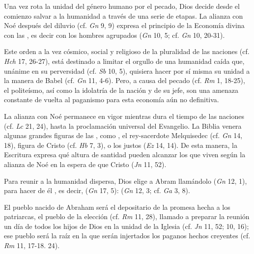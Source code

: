 \begin{ccebody}

 Una vez rota la unidad del género humano por el pecado, Dios decide desde el comienzo salvar a la humanidad a través de una serie de etapas. La alianza con Noé después del diluvio (cf. \textit{Gn} 9, 9) expresa el principio de la Economía divina con las , es decir con los hombres agrupados  (\textit{Gn} 10, 5; cf. \textit{Gn} 10, 20-31).

 Este orden a la vez cósmico, social y religioso de la pluralidad de las naciones (cf. \textit{Hch} 17, 26-27), está destinado a limitar el orgullo de una humanidad caída que, unánime en su perversidad (cf. \textit{Sb} 10, 5), quisiera hacer por sí misma su unidad a la manera de Babel (cf. \textit{Gn} 11, 4-6). Pero, a causa del pecado (cf. \textit{Rm} 1, 18-25), el politeísmo, así como la idolatría de la nación y de su jefe, son una amenaza constante de vuelta al paganismo para esta economía aún no definitiva.

 La alianza con Noé permanece en vigor mientras dura el tiempo de las naciones (cf. \textit{Lc} 21, 24), hasta la proclamación universal del Evangelio. La Biblia venera algunas grandes figuras de las , como , el rey-sacerdote Melquisedec (cf. \textit{Gn} 14, 18), figura de Cristo (cf. \textit{Hb} 7, 3), o los justos  (\textit{Ez} 14, 14). De esta manera, la Escritura expresa qué altura de santidad pueden alcanzar los que viven según la alianza de Noé en la espera de que Cristo  (\textit{Jn} 11, 52).


 Para reunir a la humanidad dispersa, Dios elige a Abram llamándolo  (\textit{Gn} 12, 1), para hacer de él , es decir,  (\textit{Gn} 17, 5):  (\textit{Gn} 12, 3; cf. \textit{Ga} 3, 8).

 El pueblo nacido de Abraham será el depositario de la promesa hecha a los patriarcas, el pueblo de la elección (cf. \textit{Rm} 11, 28), llamado a preparar la reunión un día de todos los hijos de Dios en la unidad de la Iglesia (cf. \textit{Jn} 11, 52; 10, 16); ese pueblo será la raíz en la que serán injertados los paganos hechos creyentes (cf. \textit{Rm} 11, 17-18. 24).


\end{ccebody}
